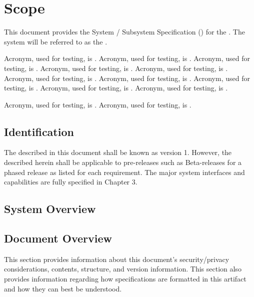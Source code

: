 
\chapter{Scope}
\label{loc:Scope}


This document provides the System / Subsystem Specification (\SSS) for the \ThisSystem. 
The system will be referred to as the \ThisSys.

Acronym, used for testing, is \dotPDF.
Acronym, used for testing, is \BioAPI.
Acronym, used for testing, is \MISO.
Acronym, used for testing, is \UASUAV.
Acronym, used for testing, is \TOCL.
Acronym, used for testing, is \USN.
Acronym, used for testing, is \USAF.
Acronym, used for testing, is \USSF.
Acronym, used for testing, is \USMC.
Acronym, used for testing, is \USArmy.


Acronym, used for testing, is \Garmin.
Acronym, used for testing, is \JIDA.


\section{Identification}
\label{loc:Identification}


The \ThisSystem described in this document shall be known as \ThisSys version 1.
However, the \SSS described herein shall be applicable to pre-releases such as Beta-releases for a phased release as listed for each requirement.
The major system interfaces and capabilities are fully specified in Chapter 3.


\section{System Overview}
\label{loc:SystemOverview}





\newpage
\section{Document Overview}
\label{loc:DocumentOverview}


This section provides information about this document's security/privacy considerations, contents, structure, and version information.
This section also provides information regarding how specifications are formatted in this artifact and how they can best be understood.

